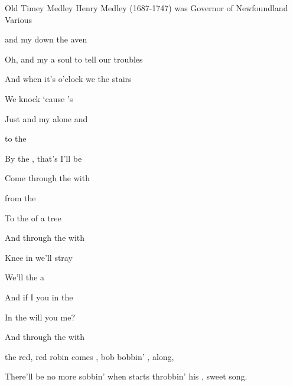 \begin{SBSong}{Old Timey Medley}
  {Henry Medley (1687-1747) was Governor of Newfoundland}
  {Various}
  \begin{SBVerse}
     and my   down the aven
    
    Oh,  and my   a soul to tell our troubles 
    
    And when it's  o'clock  we  the stairs
    
    We  knock `cause 's 
    
    Just  and my   alone and  
  \end{SBVerse}
  \begin{SBVerse}
     to the 
    
    By the , that's  I'll be
    
    Come  through the  with  
  \end{SBVerse}
  \begin{SBVerse}
     from the 
    
    To the  of a  tree
    
    And  through the  with  
  \end{SBVerse}
  \begin{SBVerse}
    Knee  in  we'll stray
    
    We'll  the  a
    
    And if I  you in the 

    In the  will you  me?
    
    And  through the  with 
  \end{SBVerse}
  \begin{SBVerse}
	 the red, red robin comes , bob bobbin' , along,
	
	There'll be no more sobbin' when  starts throbbin' his , \WBLineBrk sweet song.
	

\end{SBVerse}
\end{SBSong}
